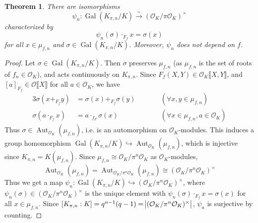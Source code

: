 \documentclass[11pt]{article}
\theoremstyle{definition}
\theoremstyle{plain}
\newtheorem{theorem}[definition]{Theorem}
\theoremstyle{remark}
\DeclareMathOperator{\Gal}{Gal}
\DeclareMathOperator{\Aut}{Aut}
\newcommand{\cO}{\mathcal{O}}
\begin{document}
\begin{theorem}\label{thm:20_7}
    There are isomorphisms
    \begin{equation*}
        \psi_n : \Gal(K_{\pi,n}/K) \xrightarrow{\sim} (\cO_K / \pi \cO_K)^\times
    \end{equation*}
    characterized by
    \begin{equation*}
        \psi_n(\sigma) \cdot_{F_f} x = \sigma(x)
    \end{equation*}
    for all $x \in \mu_{f,n}$ and $\sigma \in \Gal(K_{\pi,n}/K)$. Moreover, $\psi_n$ does not depend on $f$.
\end{theorem}
\begin{proof}
    Let $\sigma \in \Gal(K_{\pi,n}/K)$. Then $\sigma$ preserves $\mu_{f,n}$ (as $\mu_{f,n}$ is the set of roots of $f_n \in \cO_K$), and acts continuously on $K_{\pi,n}$. Since $F_f(X, Y) \in \cO_K \llbracket X, Y \rrbracket$, and $[a]_{F_f} \in \cO \llbracket X \rrbracket$ for all $a \in \cO_K$, we have
    \begin{alignat*}{3}
        \sigma(x +_{F_f} y) &= \sigma(x) +_{F_f} \sigma(y) &&\qquad (\forall x, y \in \mu_{f,n})\\
        \sigma(a \cdot_{F_f} x) &= a \cdot_{f_F} \sigma(x) &&\qquad (\forall x \in \mu_{f,n}, a \in \cO_K)
    \end{alignat*}
    Thus $\sigma \in \Aut_{\cO_K}(\mu_{f,n})$, i.e. is an automorphism on $\cO_K$-modules. This induces a group homomorphism $\Gal(K_{\pi,n}/K) \hookrightarrow \Aut_{\cO_K}(\mu_{f,n})$, which is injective since $K_{\pi,n} = K(\mu_{f,n})$. Since $\mu_{f,n} \cong \cO_K / \pi^n \cO_K$ as $\cO_K$-modules,
    \begin{equation*}
        \Aut_{\cO_K}(\mu_{f,n}) = \Aut_{\cO_K / \pi^n \cO_K}(\mu_{f,n}) \cong (\cO_K / \pi^n \cO_K)^\times
    \end{equation*}
    Thus we get a map $\psi_n : \Gal(K_{\pi,n}/K) \hookrightarrow (\cO_K / \pi^n \cO_K)^\times$, where $\psi_n(\sigma) \in (\cO_K / \pi^n \cO_K)^\times$ is the unique element with $\psi_n(\sigma) \cdot_{F_f} x = \sigma(x)$ for all $x \in \mu_{f,n}$. Since $[K_{\pi,n} : K] = q^{n-1} (q-1) = \abs{(\cO_K / \pi^n \cO_K)^\times}$, $\psi_n$ is surjective by counting.


\end{proof}
\end{document}

